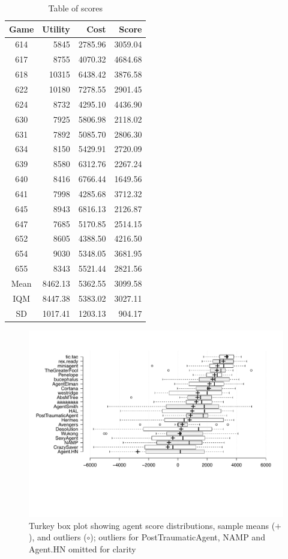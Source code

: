 \documentclass{acm_proc_article-sp}
\begin{document}
\begin{table}
  \caption{Table of scores}
  \label{tab:scores}
  \center
  \begin{tabular}{ c | r r r }
    Game & Utility & Cost    & Score   \\
    \hline
    614  & 5845    & 2785.96 & 3059.04 \\
    617  & 8755    & 4070.32 & 4684.68 \\
    618  & 10315   & 6438.42 & 3876.58 \\
    622  & 10180   & 7278.55 & 2901.45 \\
    624  & 8732    & 4295.10 & 4436.90 \\
    630  & 7925    & 5806.98 & 2118.02 \\
    631  & 7892    & 5085.70 & 2806.30 \\
    634  & 8150    & 5429.91 & 2720.09 \\
    639  & 8580    & 6312.76 & 2267.24 \\
    640  & 8416    & 6766.44 & 1649.56 \\
    641  & 7998    & 4285.68 & 3712.32 \\
    645  & 8943    & 6816.13 & 2126.87 \\
    647  & 7685    & 5170.85 & 2514.15 \\
    652  & 8605    & 4388.50 & 4216.50 \\
    654  & 9030    & 5348.05 & 3681.95 \\
    655  & 8343    & 5521.44 & 2821.56 \\
    \hline
    Mean & 8462.13 & 5362.55 & 3099.58 \\
    IQM  & 8447.38 & 5383.02 & 3027.11 \\
    SD   & 1017.41 & 1203.13 &  904.17 \\
  \end{tabular}
\end{table}

\begin{figure}
  \includegraphics[width=\linewidth]{score_box_plot.pdf}
  \caption{Turkey box plot showing agent score distributions, sample means ($+$), and outliers ($\circ$); outliers for PostTraumaticAgent, NAMP and Agent.HN omitted for clarity}
  \label{fig:score_box_plot}
\end{figure}
\end{document}
